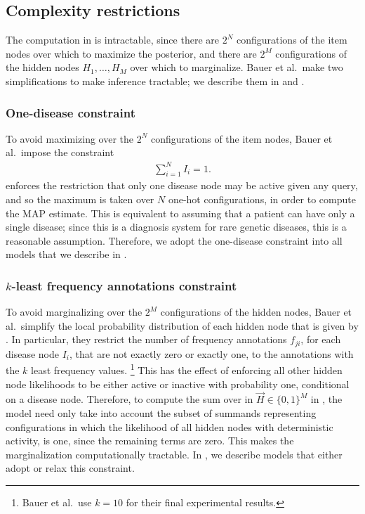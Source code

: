 \subsection{Complexity restrictions}

The computation in  is intractable, since 
there are $2^N$ configurations of the item nodes over which to maximize the
posterior, and there are $2^M$ configurations of the hidden nodes $H_1, \hdots,
H_M$ over which to marginalize.
%
Bauer et al.\ make two simplifications to make inference tractable; we describe
them in  and .

\subsubsection{One-disease constraint}
\label{subsubsec:odc}

To avoid maximizing over the $2^N$ configurations of the item nodes, Bauer et al.\
impose the constraint
%
\begin{align}
    \sum_{i=1}^N I_i = 1. \label{eq:onehot}
\end{align}
%
 enforces the restriction that only one disease node may be
active given any query, and so the maximum is taken over $N$ one-hot
configurations, in order to compute the MAP estimate.
%
This is equivalent to assuming that a patient can have only a single disease;
%
since this is a diagnosis system for rare genetic diseases, this is a reasonable
assumption.
%
Therefore, we adopt the one-disease constraint into all models that we describe
in \Section{sec:models}.

\subsubsection{$k$-least frequency annotations constraint}
\label{subsubsec:kleast}

To avoid marginalizing over the $2^M$ configurations of the hidden nodes,
Bauer et al.\ simplify the local probability distribution of each hidden node
that is given by \Equation{eq:lpdhids}.
%
In particular, they restrict the number of frequency annotations $f_{ji}$, for
each disease node $I_i$, that are not exactly zero or exactly one, to the
annotations with the $k$ least frequency values.
%
\footnote{
    Bauer et al.\ use $k=10$ for their final experimental results.
}
%
This has the effect of enforcing all other hidden node likelihoods
to be either active or inactive with probability one,
conditional on a disease node.
%
Therefore, to compute the sum over in $\vec{H} \in \{0, 1\}^M$ in
\Equation{eq:mapinf}, the model need only take into account the subset of
summands representing configurations in which the likelihood of all hidden nodes
with deterministic activity, is one, since the remaining terms are zero.
%
This makes the marginalization computationally tractable.
%
In , we describe models that either adopt or relax this
constraint.
